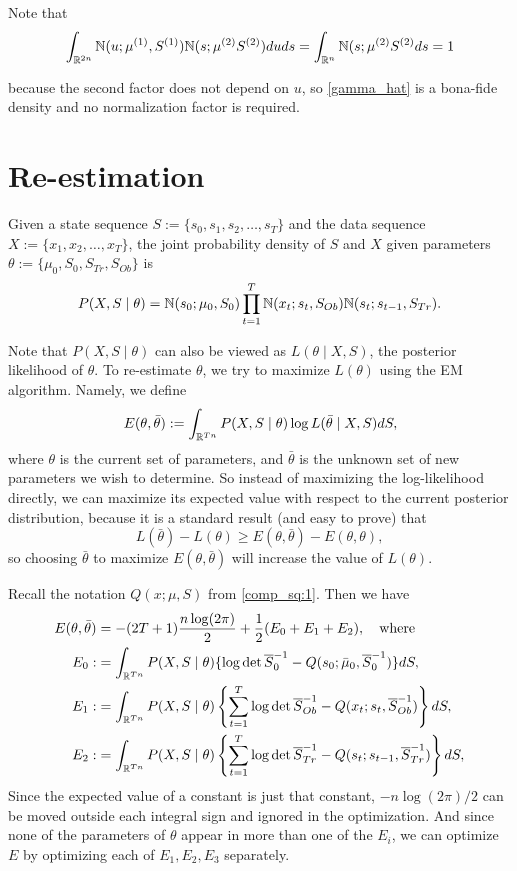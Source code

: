 \documentclass[12pt,leqno]{article}
\begin{document}
  Note that
  $$
  \int_{{\mathbb R}^{2n}}{\mathbb N}(u;\mu^{(1)},S^{(1)}){\mathbb N}(s;\mu^{(2)}S^{(2)})duds = \int_{{\mathbb R}^n}{\mathbb N}(s;\mu^{(2)}S^{(2)}ds = 1 
  $$
  
  because the second factor does not depend on $u$, so \eqref{gamma_hat} is a bona-fide density and no
  normalization factor is required.
  
\section{Re-estimation}
Given a state sequence $S := \{s_0,s_1,s_2,\dots,s_T\}$ and the data sequence $X := \{x_1,x_2,\dots,x_T\}$, the
joint probability density of $S$ and $X$ given parameters $\theta := \{\mu_0,S_0,S_{Tr},S_{Ob}\}$ is
$$
P(X,S\mid\theta) = {\mathbb N}(s_0;\mu_0,S_0)\prod_{t=1}^T{\mathbb N}(x_t;s_t,S_{Ob}){\mathbb N}(s_t;s_{t-1},S_{Tr}).
$$

Note that $P(X,S\mid\theta)$ can also be viewed as  $L(\theta\mid X,S)$, the posterior likelihood of $\theta$.
To re-estimate $\theta$, we try to maximize $L(\theta)$ using the EM algorithm. Namely, we define 
$$
E(\theta,\bar{\theta}) := \int_{{\mathbb R}^{Tn}}P(X,S\mid\theta)\log{L(\bar{\theta}\mid X,S)}dS,
$$
where $\theta$ is the current set of parameters, and $\bar{\theta}$ is the unknown set of new parameters
we wish to determine. So instead of maximizing the log-likelihood directly, we can maximize its expected
value with respect to the current posterior distribution, because it is a standard result (and easy to prove) that
$$
L(\bar{\theta}) - L(\theta) \ge E(\theta,\bar{\theta}) - E(\theta,\theta),
$$
so choosing $\bar{\theta}$ to maximize $E(\theta,\bar{\theta})$ will increase the value of $L(\theta)$.


  
Recall the notation $Q(x;\mu,S)$ from \eqref{comp_sq:1}.  Then we have
\begin{align}
  E(\theta,\bar{\theta}) &= -(2T+1)\frac{n\log(2\pi)}{2} + \frac{1}{2}(E_0 + E_1 + E_2),\quad\text{where}\notag\\
  E_0 :&=\int_{{\mathbb R}^{Tn}}P(X,S\mid\theta)\{\log\det\overline{S}^{-1}_0 - Q(s_0;\bar{\mu}_0,\overline{S}_0^{-1})\}dS,\label{E0}\\
  E_1 :&= \int_{{\mathbb R}^{Tn}}P(X,S\mid\theta)\left\{\sum_{t=1}^T\log\det\overline{S}^{-1}_{Ob} - Q(x_t;s_t,\overline{S}_{Ob}^{-1})\right\}dS,
\label{E1}\\
  E_2 :&= \int_{{\mathbb R}^{Tn}}P(X,S\mid\theta)\left\{\sum_{t=1}^T\log\det\overline{S}^{-1}_{Tr} - Q(s_t;s_{t-1},\overline{S}_{Tr}^{-1})\right\}dS,
\label{E2}
\end{align}
Since the expected value of a constant is just that constant, $-n\log(2\pi)/2$ can be moved outside each
integral sign and ignored in the optimization.  And since none of the parameters of $\theta$ appear in more
than one of the $E_i$, we can optimize $E$ by optimizing each of $E_1,E_2,E_3$ separately.
\end{document}
